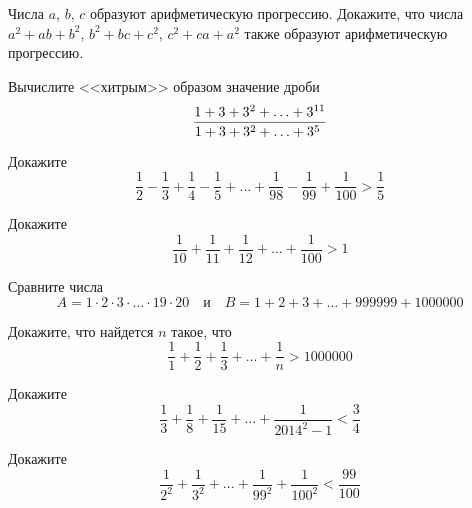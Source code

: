 \begin{problems}
\item
Числа $a$, $b$, $c$ образуют арифметическую прогрессию.
Докажите, что числа $a^2 + a b + b^2$, $b^2 + b c + c^2$, $c^2 + c a + a^2$ также
образуют арифметическую прогрессию.

\item
Вычислите <<хитрым>> образом значение дроби
\[
    \dfrac{1 + 3 + 3^{2} + \ldots + 3^{11}}{1 + 3 + 3^{2} + \ldots + 3^{5\ \mathstrut}}
\]

\item
Докажите
\[
    \frac{1}{2} - \frac{1}{3} + \frac{1}{4} - \frac{1}{5}
    + \ldots +
    \frac{1}{98} - \frac{1}{99} + \frac{1}{100}
>
    \frac{1}{5}
\]

\item
Докажите
\[
    \frac{1}{10} + \frac{1}{11} + \frac{1}{12} + \ldots + \frac{1}{100}
>
    1
\]

\item
Сравните числа
\[
    A = 1 \cdot 2 \cdot 3 \cdot \ldots \cdot 19 \cdot 20
\quad\text{и}\quad
    B = 1 + 2 + 3 + \ldots + 999999 + 1000000
\]

\item
Докажите, что найдется $n$ такое, что
\[
    \frac{1}{1} + \frac{1}{2} + \frac{1}{3} + \ldots + \frac{1}{n}
>
    1000000
\]

\item
Докажите
\[
    \frac{1}{3} + \dfrac{1}{8} + \frac{1}{15} + \ldots + \frac{1}{2014^2 - 1}
<
    \frac{3}{4}
\]

\item
Докажите
\[
    \frac{1}{2^2} + \frac{1}{3^2} + \ldots + \frac{1}{99^2} + \frac{1}{100^2}
<
    \frac{99}{100}
\]

\end{problems}

